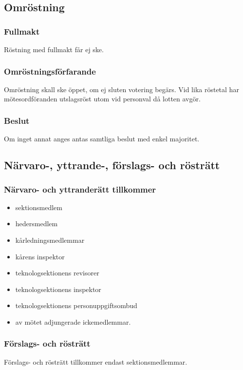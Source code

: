 \subsection{Omröstning}

\subsubsection{Fullmakt}
Röstning med fullmakt får ej ske.

\subsubsection{Omröstningsförfarande}
Omröstning skall ske öppet, om ej sluten votering begärs. Vid lika röstetal har mötesordföranden utslagsröst utom vid personval då lotten avgör.

\subsubsection{Beslut}
Om inget annat anges antas samtliga beslut med enkel majoritet.

\subsection{Närvaro-, yttrande-, förslags- och rösträtt}

\subsubsection{Närvaro- och yttranderätt tillkommer}
\begin{itemize}
	\item sektionsmedlem
	\item hedersmedlem
	\item kårledningsmedlemmar
	\item kårens inspektor
	\item teknologsektionens revisorer
	\item teknologsektionens inspektor
	\item teknologsektionens personuppgiftsombud
	\item av mötet adjungerade ickemedlemmar.
\end{itemize}

\subsubsection{Förslags- och rösträtt}
Förslags- och rösträtt tillkommer endast sektionsmedlemmar.

